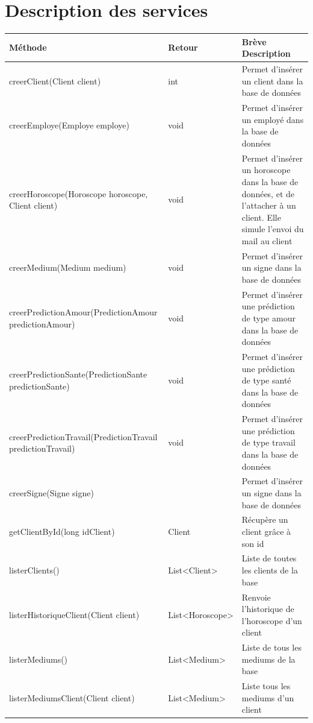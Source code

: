 \documentclass[letterpaper,10pt,french]{sphinxmanual}
\begin{document}
\section{Description des services}
\label{services::doc}\label{services:description-des-services}
\begin{tabulary}{\linewidth}{|L|L|L|}
\hline
\textsf{\relax 
Méthode
} & \textsf{\relax 
Retour
} & \textsf{\relax 
Brève Description
}\\
\hline
creerClient(Client client)
 & 
int
 & 
Permet d'insérer un client dans la base de données
\\
\hline
creerEmploye(Employe employe)
 & 
void
 & 
Permet d'insérer un employé dans la base de données
\\
\hline
creerHoroscope(Horoscope horoscope, Client client)
 & 
void
 & 
Permet d'insérer un horoscope dans la base de données,
et de l'attacher à un client.
Elle simule l'envoi du mail au client
\\
\hline
creerMedium(Medium medium)
 & 
void
 & 
Permet d'insérer un signe dans la base de données
\\
\hline
creerPredictionAmour(PredictionAmour predictionAmour)
 & 
void
 & 
Permet d'insérer une prédiction de type amour dans la base de données
\\
\hline
creerPredictionSante(PredictionSante predictionSante)
 & 
void
 & 
Permet d'insérer une prédiction de type santé dans la base de données
\\
\hline
creerPredictionTravail(PredictionTravail predictionTravail)
 & 
void
 & 
Permet d'insérer une prédiction de type travail dans la base de données
\\
\hline
creerSigne(Signe signe)
 &  & 
Permet d'insérer un signe dans la base de données
\\
\hline
getClientById(long idClient)
 & 
Client
 & 
Récupère un client grâce à son id
\\
\hline
listerClients()
 & 
List\textless{}Client\textgreater{}
 & 
Liste de toutes les clients de la base
\\
\hline
listerHistoriqueClient(Client client)
 & 
List\textless{}Horoscope\textgreater{}
 & 
Renvoie l'historique de l'horoscope d'un client
\\
\hline
listerMediums()
 & 
List\textless{}Medium\textgreater{}
 & 
Liste de tous les mediums de la base
\\
\hline
listerMediumsClient(Client client)
 & 
List\textless{}Medium\textgreater{}
 & 
Liste tous les mediums d'un client
\\

\end{tabulary}
\end{document}
